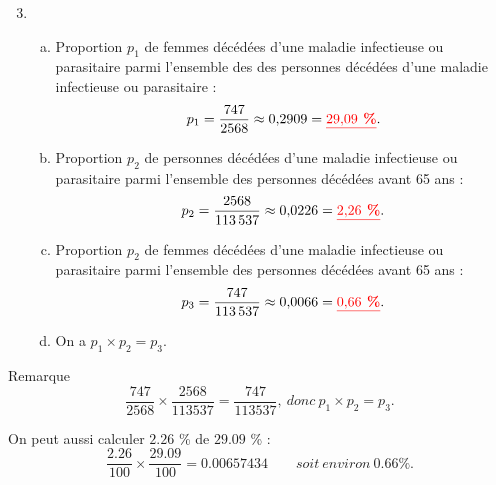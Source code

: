\documentclass[xcolor={dvipsnames}]{beamer}
\begin{document}
	
\begin{frame}{}
\begin{enumerate}%
	\setcounter{enumi}{2}
	
	\item \begin{enumerate}[a)]
		\item Proportion $p_1$ de femmes décédées d'une maladie infectieuse ou parasitaire parmi l'ensemble des des personnes décédées d'une maladie infectieuse ou parasitaire :\pause
		\begin{equation*}
			p_1 = \dfrac{\num{747}}{\num{2568}} \approx \num{0.2909} = \textcolor{red}{\underline{\textbf{\num{29.09} \%}}}.
		\end{equation*}\pause
		
		\item Proportion $p_2$ de personnes décédées d'une maladie infectieuse ou parasitaire parmi l'ensemble des personnes décédées avant 65 ans :\pause
		\begin{equation*}
			p_2 = \dfrac{\num{2568}}{\num{113537}} \approx \num{0.0226} = \textcolor{red}{\underline{\textbf{\num{2.26} \%}}}.
		\end{equation*}\pause
		
		\item Proportion $p_2$ de femmes décédées d'une maladie infectieuse ou parasitaire parmi l'ensemble des personnes décédées avant 65 ans :\pause
		\begin{equation*}
			p_3 = \dfrac{\num{747}}{\num{113537}} \approx \num{0.0066} = \textcolor{red}{\underline{\textbf{\num{0.66} \%}}}.
		\end{equation*}\pause
		
		\item On a $p_1 \times p_2 = p_3$.
		
	\end{enumerate}
\end{enumerate}
\end{frame}	
	
	
\begin{frame}
	\begin{block}{Remarque}
		\begin{equation*}
			\dfrac{\num{747}}{\num{2568}} \times \dfrac{\num{2568}}{\num{113537}} = \dfrac{\num{747}}{\num{113537}}, \: donc \: p_1\times p_2 = p_3.
		\end{equation*}
		
		On peut aussi calculer $\num{2.26}$ \% de $\num{29.09}$ \% :
		\begin{equation*}
			\dfrac{\num{2.26}}{\num{100}} \times \dfrac{\num{29.09}}{\num{100}} = \num{0.00657434} \qquad soit \: environ \: \num{0.66} \%.
		\end{equation*}
	\end{block}
\end{frame}
\end{document}
